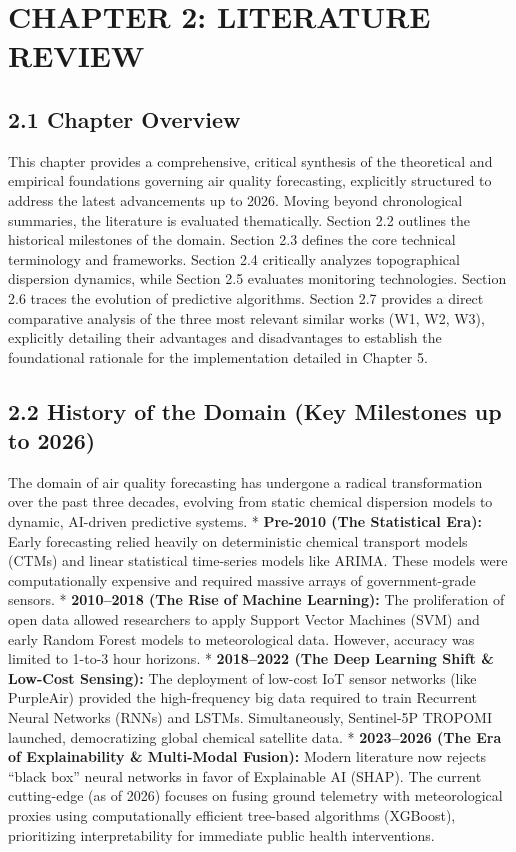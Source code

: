 \chapter{CHAPTER 2: LITERATURE
REVIEW}\label{chapter-2-literature-review}

\section{2.1 Chapter Overview}\label{chapter-overview}

This chapter provides a comprehensive, critical synthesis of the
theoretical and empirical foundations governing air quality forecasting,
explicitly structured to address the latest advancements up to 2026.
Moving beyond chronological summaries, the literature is evaluated
thematically. Section 2.2 outlines the historical milestones of the
domain. Section 2.3 defines the core technical terminology and
frameworks. Section 2.4 critically analyzes topographical dispersion
dynamics, while Section 2.5 evaluates monitoring technologies. Section
2.6 traces the evolution of predictive algorithms. Section 2.7 provides
a direct comparative analysis of the three most relevant similar works
(W1, W2, W3), explicitly detailing their advantages and disadvantages to
establish the foundational rationale for the implementation detailed in
Chapter 5.

\section{2.2 History of the Domain (Key Milestones up to
2026)}\label{history-of-the-domain-key-milestones-up-to-2026}

The domain of air quality forecasting has undergone a radical
transformation over the past three decades, evolving from static
chemical dispersion models to dynamic, AI-driven predictive systems. *
\textbf{Pre-2010 (The Statistical Era):} Early forecasting relied
heavily on deterministic chemical transport models (CTMs) and linear
statistical time-series models like ARIMA. These models were
computationally expensive and required massive arrays of
government-grade sensors. * \textbf{2010--2018 (The Rise of Machine
Learning):} The proliferation of open data allowed researchers to apply
Support Vector Machines (SVM) and early Random Forest models to
meteorological data. However, accuracy was limited to 1-to-3 hour
horizons. * \textbf{2018--2022 (The Deep Learning Shift \& Low-Cost
Sensing):} The deployment of low-cost IoT sensor networks (like
PurpleAir) provided the high-frequency big data required to train
Recurrent Neural Networks (RNNs) and LSTMs. Simultaneously, Sentinel-5P
TROPOMI launched, democratizing global chemical satellite data. *
\textbf{2023--2026 (The Era of Explainability \& Multi-Modal Fusion):}
Modern literature now rejects ``black box'' neural networks in favor of
Explainable AI (SHAP). The current cutting-edge (as of 2026) focuses on
fusing ground telemetry with meteorological proxies using
computationally efficient tree-based algorithms (XGBoost), prioritizing
interpretability for immediate public health interventions.

